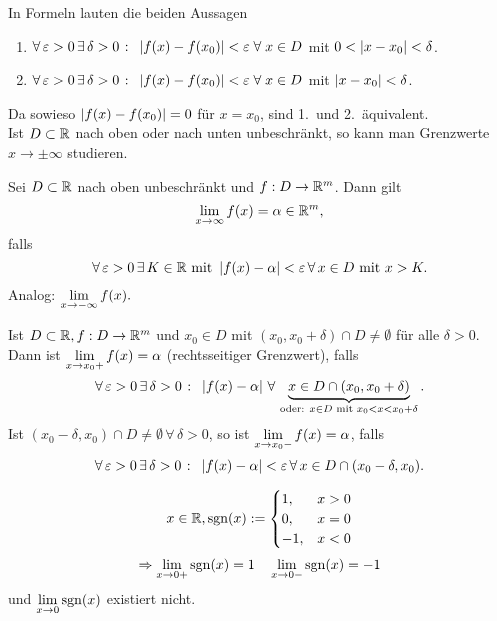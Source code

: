 \documentclass[../ana1.tex]{subfiles}
\begin{document}
\begin{bew}
    In Formeln lauten die beiden Aussagen 
    \begin{enumerate}
        \item \( \forall \, \varepsilon > 0 \,\exists \, \delta > 0
        \; \colon \; \left| f(x) - f(x_0) \right| < \varepsilon \;\forall \;
        x \in D \) mit \( 0 < \left|x-x_0\right| < \delta \).
        \item \( \forall \, \varepsilon > 0 \,\exists \, \delta > 0
        \; \colon \; \left| f(x) - f(x_0) \right| < \varepsilon \;\forall \;
        x \in D \) mit \( \left|x-x_0\right| < \delta \).
    \end{enumerate}
    Da sowieso \( \left|f(x) -f(x_0)\right| = 0 \) für \( x=x_0 \), sind 1.\ und
    2.\ äquivalent.\\
    Ist \( D\subset \mathbb{R} \) nach oben oder nach unten unbeschränkt, so 
    kann man Grenzwerte \( x \rightarrow \pm \infty \) studieren.
\end{bew}
\begin{defi}
    Sei \( D \subset \mathbb{R} \) nach oben unbeschränkt und 
    \( f:D\rightarrow \mathbb{R}^m \). Dann gilt 
    \[ \lim\limits_{x\rightarrow\infty} f(x) = \alpha \in \mathbb{R}^m, \]
    falls
    \[ \forall \,\varepsilon > 0 \,\exists \, K\in\mathbb{R} \text{ mit } 
    \left|f(x) - \alpha\right| < \varepsilon \,\forall \, x \in D 
    \text{ mit } x > K. \]
    Analog: \( \lim\limits_{x\rightarrow -\infty} f(x). \)
\end{defi}
\begin{defi}
    Ist \( D \subset \mathbb{R}, f : D\rightarrow \mathbb{R}^m \) und \( x_0 \in D \)
    mit \( (x_0, x_0 + \delta) \cap D \neq \emptyset \) für alle 
    \( \delta > 0 \). Dann ist \( \lim\limits_{x\rightarrow x_0+} f(x) = \alpha \) 
    (rechtsseitiger Grenzwert), falls
    \[ \forall \,\varepsilon > 0 \,\exists \, \delta > 0 \;\colon \;
    \left| f(x) - \alpha \right| \,\forall \, \underbrace{ x\in D \cap 
    (x_0, x_0 + \delta) }_{ \text{oder: } x\in D \text{ mit } 
    x_0 < x < x_0 + \delta }. \]
    Ist \( (x_0 - \delta, x_0) \cap D \neq \emptyset \,\forall \, 
    \delta > 0 \), so ist \( \lim\limits_{x\rightarrow x_0-} f(x) = \alpha \), falls
    \[ \forall \, \varepsilon > 0 \,\exists \, \delta > 0 \;\colon \; 
    \left|f(x) - \alpha\right| < \varepsilon \,\forall \, x \in D \cap 
    (x_0 - \delta, x_0). \]
\end{defi}
\begin{bsp}
    \[ x\in\mathbb{R}, \mathrm{sgn}(x) := 
    \begin{cases}
        1,  &x>0\\
        0,  &x=0\\
        -1, &x<0
    \end{cases} \]
    \[ \Rightarrow \lim\limits_{x\rightarrow 0+} \mathrm{sgn}(x) = 1 \quad \lim\limits_{x\rightarrow 0-} \mathrm{sgn}(x) = -1 \]
    und \( \lim\limits_{x\rightarrow 0} \mathrm{sgn}(x) \) existiert nicht.
\end{bsp}
\end{document}
